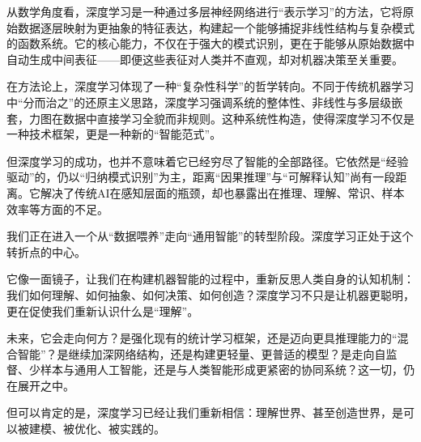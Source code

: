 从数学角度看，深度学习是一种通过多层神经网络进行“表示学习”的方法，它将原始数据逐层映射为更抽象的特征表达，构建起一个能够捕捉非线性结构与复杂模式的函数系统。它的核心能力，不仅在于强大的模式识别，更在于能够从原始数据中自动生成中间表征——即便这些表征对人类并不直观，却对机器决策至关重要。

在方法论上，深度学习体现了一种“复杂性科学”的哲学转向。不同于传统机器学习中“分而治之”的还原主义思路，深度学习强调系统的整体性、非线性与多层级嵌套，力图在数据中直接学习全貌而非规则。这种系统性构造，使得深度学习不仅是一种技术框架，更是一种新的“智能范式”。

但深度学习的成功，也并不意味着它已经穷尽了智能的全部路径。它依然是“经验驱动”的，仍以“归纳模式识别”为主，距离“因果推理”与“可解释认知”尚有一段距离。它解决了传统AI在感知层面的瓶颈，却也暴露出在推理、理解、常识、样本效率等方面的不足。

我们正在进入一个从“数据喂养”走向“通用智能”的转型阶段。深度学习正处于这个转折点的中心。

它像一面镜子，让我们在构建机器智能的过程中，重新反思人类自身的认知机制：我们如何理解、如何抽象、如何决策、如何创造？深度学习不只是让机器更聪明，更在促使我们重新认识什么是“理解”。

未来，它会走向何方？是强化现有的统计学习框架，还是迈向更具推理能力的“混合智能”？是继续加深网络结构，还是构建更轻量、更普适的模型？是走向自监督、少样本与通用人工智能，还是与人类智能形成更紧密的协同系统？这一切，仍在展开之中。

但可以肯定的是，深度学习已经让我们重新相信：理解世界、甚至创造世界，是可以被建模、被优化、被实践的。

\nocite{*}
\printbibliography[heading=bibintoc, title=\ebibname]

\newpage